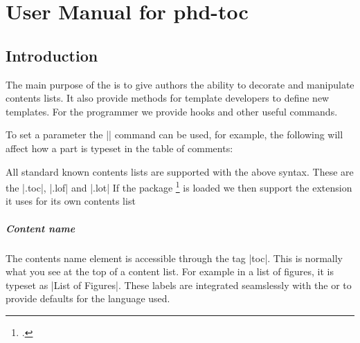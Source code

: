 \chapter{User Manual for phd-toc}
\label{ch:toc}




\section{Introduction}

The main purpose of the  is to give authors the ability to decorate and manipulate  contents lists. It also
provide methods for template developers to define new templates. For the programmer we provide hooks and other
useful commands.

To set a parameter the |\cxset| command can be used, for example, the following will affect how a part is typeset in the table of comments:

\begin{teX}
\end{teX}

All standard \latexe known contents lists are supported with the above syntax. These are the |.toc|, |.lof| and |.lot|
If the package \footcite{listings} is loaded we then support the extension it uses for its own contents list

\paragraph{Content name} The contents name element is accessible through the tag |toc|. This is normally what you see at the top of a content list. For example in a list of figures, it is typeset as |List of Figures|. These labels are integrated seamslessly with the  or  to provide defaults for the language used. 

